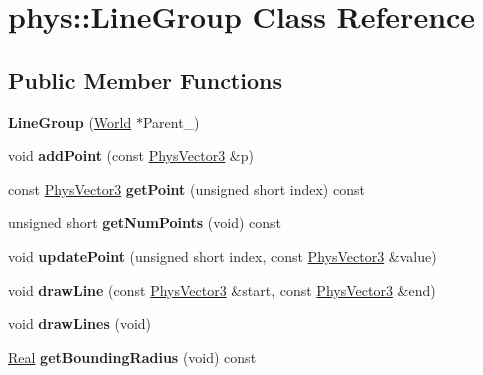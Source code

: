 \hypertarget{classphys_1_1LineGroup}{
\section{phys::LineGroup Class Reference}
\label{db/ddb/classphys_1_1LineGroup}
}
\subsection*{Public Member Functions}
\begin{DoxyCompactItemize}
\item 
\hypertarget{classphys_1_1LineGroup_a676039a6beec56d24c631e9da5fd7e76}{
{\bfseries LineGroup} (\hyperlink{classphys_1_1World}{World} $\ast$Parent\_\-)}
\label{db/ddb/classphys_1_1LineGroup_a676039a6beec56d24c631e9da5fd7e76}

\item 
\hypertarget{classphys_1_1LineGroup_a550582bde23059645b5966a384734131}{
void {\bfseries addPoint} (const \hyperlink{classPhysVector3}{PhysVector3} \&p)}
\label{db/ddb/classphys_1_1LineGroup_a550582bde23059645b5966a384734131}

\item 
\hypertarget{classphys_1_1LineGroup_a1f8366cdcb04a993639439cc3d8b21f7}{
const \hyperlink{classPhysVector3}{PhysVector3} {\bfseries getPoint} (unsigned short index) const }
\label{db/ddb/classphys_1_1LineGroup_a1f8366cdcb04a993639439cc3d8b21f7}

\item 
\hypertarget{classphys_1_1LineGroup_af067776a5c13cc9a31837c17a74c8531}{
unsigned short {\bfseries getNumPoints} (void) const }
\label{db/ddb/classphys_1_1LineGroup_af067776a5c13cc9a31837c17a74c8531}

\item 
\hypertarget{classphys_1_1LineGroup_a6f579620fcccb26adde37e7953e10271}{
void {\bfseries updatePoint} (unsigned short index, const \hyperlink{classPhysVector3}{PhysVector3} \&value)}
\label{db/ddb/classphys_1_1LineGroup_a6f579620fcccb26adde37e7953e10271}

\item 
\hypertarget{classphys_1_1LineGroup_aed46446e634948f8c73a5b26406cb5af}{
void {\bfseries drawLine} (const \hyperlink{classPhysVector3}{PhysVector3} \&start, const \hyperlink{classPhysVector3}{PhysVector3} \&end)}
\label{db/ddb/classphys_1_1LineGroup_aed46446e634948f8c73a5b26406cb5af}

\item 
\hypertarget{classphys_1_1LineGroup_ade1bb4f8e1164e1b8d7aeabbc970b79d}{
void {\bfseries drawLines} (void)}
\label{db/ddb/classphys_1_1LineGroup_ade1bb4f8e1164e1b8d7aeabbc970b79d}

\item 
\hypertarget{classphys_1_1LineGroup_a9dbbd74f5256ee67454ef6ede752dc32}{
\hyperlink{namespacephys_af7eb897198d265b8e868f45240230d5f}{Real} {\bfseries getBoundingRadius} (void) const }
\label{db/ddb/classphys_1_1LineGroup_a9dbbd74f5256ee67454ef6ede752dc32}

\end{DoxyCompactItemize}


